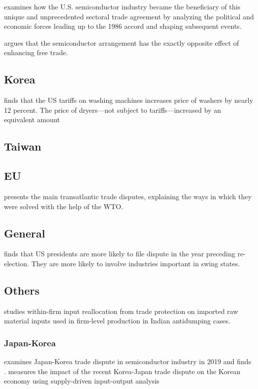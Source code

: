 \documentclass[10pt]{article} %
\begin{document}
    \cite{Irwin1994} examines how the U.S. semiconductor industry became the beneficiary of this unique and unprecedented sectoral trade agreement by analyzing the political and economic forces leading up to the 1986 accord and shaping subsequent events.

    \cite{Baldwin1990} argues that the semiconductor arrangement has the exactly opposite effect of enhancing free trade.

    \subsection{Korea}
    \cite{FlaaenHortacsuTintelnot2020} finds that the US tariffs on washing machines increases price of washers by nearly 12 percent. The price of dryers—not subject to tariffs—increased by an equivalent amount

    \subsection{Taiwan}

    \subsection{EU}
    \cite{AndreescuRadu2013} presents the main transatlantic trade disputes, explaining the ways in which they were solved with the help of the WTO.

    \subsection{General}
    \cite{Conconietal2017} finds that US presidents are more likely to file dispute in the year preceding re-election. They are more likely to involve industries important in swing states.
    \subsection{Others}
    \cite{VandenbusscheViegelahn2018} studies within-firm input reallocation from trade protection on imported raw material inputs used in firm-level production in Indian antidumping cases.
        \subsubsection{Japan-Korea}
        \cite{MakiokaZhang2023} examines Japan-Korea trade dispute in semiconductor industry in 2019 and finds .
        \cite{Kim2021} measures the impact of the recent Korea-Japan trade dispute on the Korean economy using supply-driven input-output analysis
    
\end{document}
